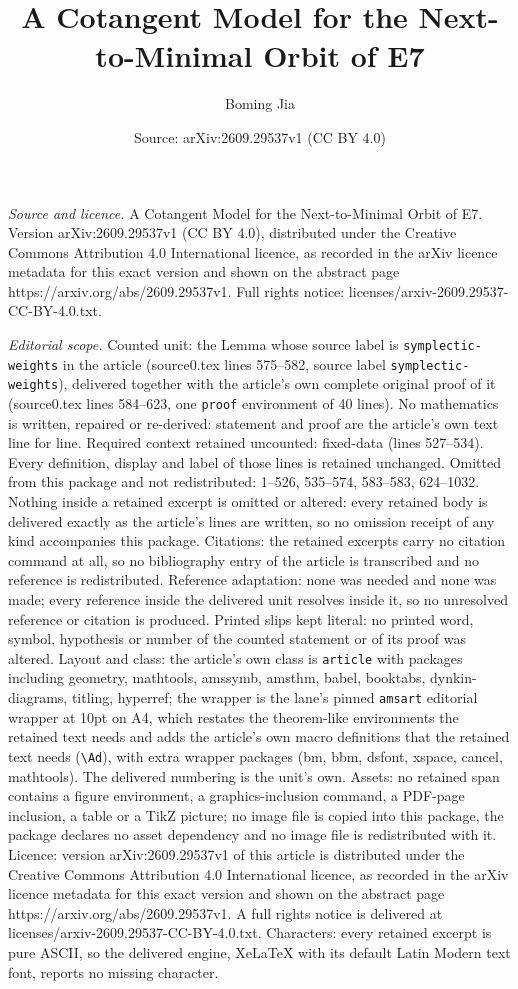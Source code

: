 \documentclass[10pt,a4paper]{amsart}
\title[A Cotangent Model for the Next-to-Minimal Orbit of E7]{A Cotangent Model for the Next-to-Minimal Orbit of E7}
\author{Boming Jia}
\date{Source: arXiv:2609.29537v1 (CC BY 4.0)}
\begin{document}
\maketitle

\noindent\emph{Source and licence.} A Cotangent Model for the Next-to-Minimal Orbit of E7. Version arXiv:2609.29537v1 (CC BY 4.0), distributed under the Creative Commons Attribution 4.0 International licence, as recorded in the arXiv licence metadata for this exact version and shown on the abstract page https://arxiv.org/abs/2609.29537v1. Full rights notice: licenses/arxiv-2609.29537-CC-BY-4.0.txt.\par\smallskip

\noindent\textit{Editorial scope.} Counted unit: the Lemma whose source label is \texttt{symplectic-weights} in the article (source0.tex lines 575--582, source label \texttt{symplectic-weights}), delivered together with the article's own complete original proof of it (source0.tex lines 584--623, one \texttt{proof} environment of 40 lines). No mathematics is written, repaired or re-derived: statement and proof are the article's own text line for line. Required context retained uncounted: fixed-data (lines 527--534). Every definition, display and label of those lines is retained unchanged. Omitted from this package and not redistributed: 1--526, 535--574, 583--583, 624--1032. Nothing inside a retained excerpt is omitted or altered: every retained body is delivered exactly as the article's lines are written, so no omission receipt of any kind accompanies this package. Citations: the retained excerpts carry no citation command at all, so no bibliography entry of the article is transcribed and no reference is redistributed. Reference adaptation: none was needed and none was made; every reference inside the delivered unit resolves inside it, so no unresolved reference or citation is produced. Printed slips kept literal: no printed word, symbol, hypothesis or number of the counted statement or of its proof was altered. Layout and class: the article's own class is \texttt{article} with packages including geometry, mathtools, amssymb, amsthm, babel, booktabs, dynkin-diagrams, titling, hyperref; the wrapper is the lane's pinned \texttt{amsart} editorial wrapper at 10pt on A4, which restates the theorem-like environments the retained text needs and adds the article's own macro definitions that the retained text needs (\texttt{\textbackslash Ad}), with extra wrapper packages (bm, bbm, dsfont, xspace, cancel, mathtools). The delivered numbering is the unit's own. Assets: no retained span contains a figure environment, a graphics-inclusion command, a PDF-page inclusion, a table or a TikZ picture; no image file is copied into this package, the package declares no asset dependency and no image file is redistributed with it. Licence: version arXiv:2609.29537v1 of this article is distributed under the Creative Commons Attribution 4.0 International licence, as recorded in the arXiv licence metadata for this exact version and shown on the abstract page https://arxiv.org/abs/2609.29537v1. A full rights notice is delivered at licenses/arxiv-2609.29537-CC-BY-4.0.txt. Characters: every retained excerpt is pure ASCII, so the delivered engine, XeLaTeX with its default Latin Modern text font, reports no missing character.
\end{document}
